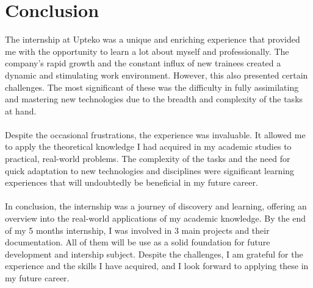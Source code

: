 \chapter*{Conclusion}


The internship at Upteko was a unique and enriching experience that provided me with the opportunity to learn a lot about myself and professionally.
The company's rapid growth and the constant influx of new trainees created a dynamic and stimulating work environment. However, this also presented certain challenges.
The most significant of these was the difficulty in fully assimilating and mastering new technologies due to the breadth and complexity of the tasks at hand.
\\ \\
Despite the occasional frustrations, the experience was invaluable. It allowed me to apply the theoretical knowledge I had acquired in my academic studies to practical,
real-world problems. The complexity of the tasks and the need for quick adaptation to new technologies and disciplines were significant learning experiences that will undoubtedly
be beneficial in my future career.
\\ \\
In conclusion, the internship was a journey of discovery and learning, offering an overview into the real-world applications of my academic knowledge.
By the end of my 5 months internship, I was involved in 3 main projects and their documentation. All of them will be use as a solid foundation for future development and intership subject.
Despite the challenges, I am grateful for the experience and the skills I have acquired, and I look forward to applying these in my future career.